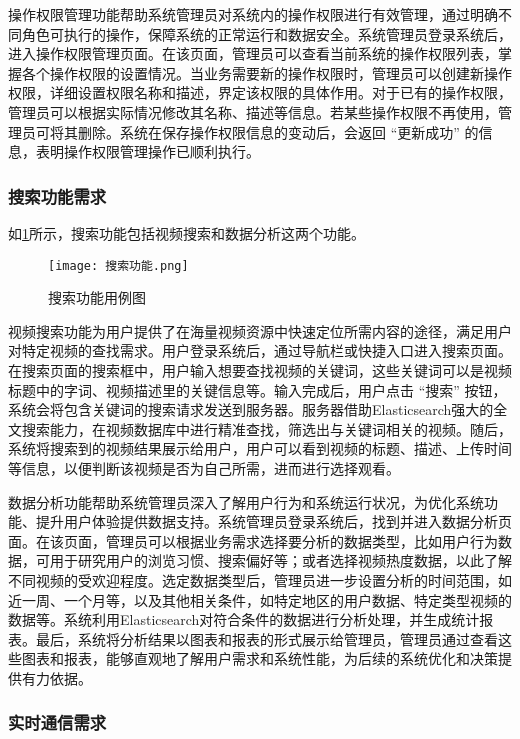 操作权限管理功能帮助系统管理员对系统内的操作权限进行有效管理，通过明确不同角色可执行的操作，保障系统的正常运行和数据安全。系统管理员登录系统后，进入操作权限管理页面。在该页面，管理员可以查看当前系统的操作权限列表，掌握各个操作权限的设置情况。当业务需要新的操作权限时，管理员可以创建新操作权限，详细设置权限名称和描述，界定该权限的具体作用。对于已有的操作权限，管理员可以根据实际情况修改其名称、描述等信息。若某些操作权限不再使用，管理员可将其删除。系统在保存操作权限信息的变动后，会返回 “更新成功” 的信息，表明操作权限管理操作已顺利执行。

\subsubsection{搜索功能需求}

如\ref{搜索功能用例图}所示，搜索功能包括视频搜索和数据分析这两个功能。
\begin{figure}[hbt]
    \centering
    \texttt{[image: 搜索功能.png]}
    \caption{搜索功能用例图}
    \label{搜索功能用例图}
\end{figure}

视频搜索功能为用户提供了在海量视频资源中快速定位所需内容的途径，满足用户对特定视频的查找需求。用户登录系统后，通过导航栏或快捷入口进入搜索页面。在搜索页面的搜索框中，用户输入想要查找视频的关键词，这些关键词可以是视频标题中的字词、视频描述里的关键信息等。输入完成后，用户点击 “搜索” 按钮，系统会将包含关键词的搜索请求发送到服务器。服务器借助Elasticsearch强大的全文搜索能力，在视频数据库中进行精准查找，筛选出与关键词相关的视频。随后，系统将搜索到的视频结果展示给用户，用户可以看到视频的标题、描述、上传时间等信息，以便判断该视频是否为自己所需，进而进行选择观看。

数据分析功能帮助系统管理员深入了解用户行为和系统运行状况，为优化系统功能、提升用户体验提供数据支持。系统管理员登录系统后，找到并进入数据分析页面。在该页面，管理员可以根据业务需求选择要分析的数据类型，比如用户行为数据，可用于研究用户的浏览习惯、搜索偏好等；或者选择视频热度数据，以此了解不同视频的受欢迎程度。选定数据类型后，管理员进一步设置分析的时间范围，如近一周、一个月等，以及其他相关条件，如特定地区的用户数据、特定类型视频的数据等。系统利用Elasticsearch对符合条件的数据进行分析处理，并生成统计报表。最后，系统将分析结果以图表和报表的形式展示给管理员，管理员通过查看这些图表和报表，能够直观地了解用户需求和系统性能，为后续的系统优化和决策提供有力依据。

\subsubsection{实时通信需求}

